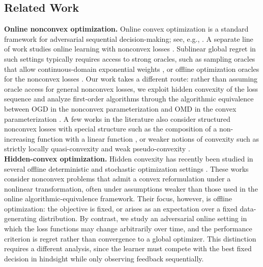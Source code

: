 \documentclass[a4paper,11pt,fullpage]{article}
\theoremstyle{plain}
\theoremstyle{definition}
\theoremstyle{plain}
\begin{document}
\subsection{Related Work}

\noindent\textbf{Online nonconvex optimization.}
Online convex optimization is a standard framework for adversarial sequential decision-making; see, e.g., \citet{hazan16oco,shalev-shwartz12oco-ftml,orabona19book-online-learning}. 
A separate line of work studies online learning with nonconvex losses \citep{krichene-et-al15hedge-continuum,agarwal-gonen-hazan19,suggala-netrapalli20,heliou-et-al20}. 
Sublinear global regret in such settings typically requires access to strong oracles, such as sampling oracles that allow continuous-domain exponential weights \citep{maillard-munos10,krichene-et-al15hedge-continuum}, or offline optimization oracles for the nonconvex losses \citep{agarwal-gonen-hazan19,suggala-netrapalli20}. 
Our work takes a different route: rather than assuming oracle access for general nonconvex losses, we exploit hidden convexity of the loss sequence and analyze first-order algorithms through the algorithmic equivalence between OGD in the nonconvex parameterization and OMD in the convex parameterization \citep{amid2020reparameterizing,ghai-lu-hazan22,li-et-al22implicit-bias}. A few works in the literature also consider structured nonconvex losses with special structure such as the composition of a non-increasing function with a linear function \citep{zhang-et-al15}, or weaker notions of convexity such as strictly locally quasi-convexity \citep{hazan-et-al15beyond-cvx} and weak pseudo-convexity \citep{gao-li-zhang18}.\\

\noindent\textbf{Hidden-convex optimization.}
Hidden convexity has recently been studied in several offline deterministic and stochastic optimization settings \citep{chen-et-al25,fatkhullin-he-hu25stoch-hidden-cv,fatkhullin-et-al25constrained-hidden-cv,levin-kileel-boumal25}. 
These works consider nonconvex problems that admit a convex reformulation under a nonlinear transformation, often under assumptions weaker than those used in the online algorithmic-equivalence framework. 
Their focus, however, is offline optimization: the objective is fixed, or arises as an expectation over a fixed data-generating distribution. 
By contrast, we study an adversarial online setting in which the loss functions may change arbitrarily over time, and the performance criterion is regret rather than convergence to a global optimizer. 
This distinction requires a different analysis, since the learner must compete with the best fixed decision in hindsight while only observing feedback sequentially.\\
\end{document}
